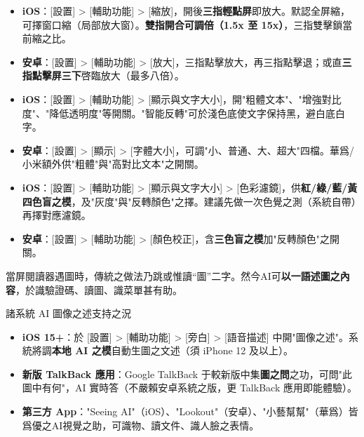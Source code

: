 

\begin{itemize}
  \item \textbf{iOS}：[設置] > [輔助功能] > [縮放]，開後\textbf{三指輕點屏}即放大。默認全屏縮，可擇窗口縮（局部放大窗）。\textbf{雙指開合可調倍（1.5x 至 15x）}，三指雙擊鎖當前縮之比。
  \item \textbf{安卓}：[設置] > [輔助功能] > [放大]，三指點擊放大，再三指點擊退；或直\textbf{三指點擊屏三下}啓臨放大（最多八倍）。
\end{itemize}


\begin{itemize}
  \item \textbf{iOS}：[設置] > [輔助功能] > [顯示與文字大小]，開"粗體文本"、"增強對比度"、"降低透明度"等開關。"智能反轉"可於淺色底使文字保持黑，避白底白字。
  \item \textbf{安卓}：[設置] > [顯示] > [字體大小]，可調"小、普通、大、超大"四檔。華爲/小米額外供"粗體"與"高對比文本"之開關。
\end{itemize}


\begin{itemize}
  \item \textbf{iOS}：[設置] > [輔助功能] > [顯示與文字大小] > [色彩濾鏡]，供\textbf{紅/綠/藍/黃四色盲之模}，及"灰度"與"反轉顏色"之擇。建議先做一次色覺之測（系統自帶）再擇對應濾鏡。
  \item \textbf{安卓}：[設置] > [輔助功能] > [顏色校正]，含\textbf{三色盲之模}加"反轉顏色"之開關。
\end{itemize}


當屏閱讀器遇圖時，傳統之做法乃跳或惟讀“圖”二字。然今AI可\textbf{以一語述圖之內容}，於識驗證碼、讀圖、識菜單甚有助。

\begin{tcbinfo}{諸系統 AI 圖像之述支持之況}
\begin{itemize}
  \item \textbf{iOS 15+}：於 [設置] > [輔助功能] > [旁白] > [語音描述] 中開"圖像之述"。系統將調\textbf{本地 AI 之模}自動生圖之文述（須 iPhone 12 及以上）。
  \item \textbf{新版 TalkBack 應用}：Google TalkBack 于較新版中集\textbf{圖之問}之功，可問"此圖中有何"，AI 實時答（不嚴賴安卓系統之版，更 TalkBack 應用即能體驗）。
  \item \textbf{第三方 App}："Seeing AI"（iOS）、"Lookout"（安卓）、"小藝幫幫"（華爲）皆爲優之AI視覺之助，可識物、讀文件、識人臉之表情。
\end{itemize}

\end{tcbinfo}

